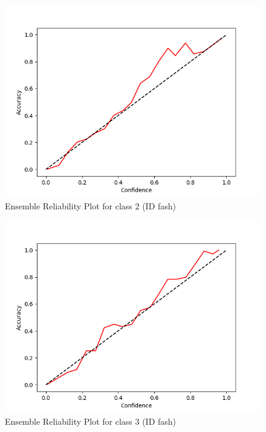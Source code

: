 \documentclass[11pt]{article}
\begin{document}
\begin{figure}[htbp]
\centering
\includegraphics[width=.9\linewidth]{./ens_fash_rel_2.png}
\caption{\label{fig:org4c4dbb2}
Ensemble Reliability Plot for class 2 (ID fash)}
\end{figure}

\begin{figure}[htbp]
\centering
\includegraphics[width=.9\linewidth]{./ens_fash_rel_3.png}
\caption{\label{fig:org5777caa}
Ensemble Reliability Plot for class 3 (ID fash)}
\end{figure}
\end{document}
